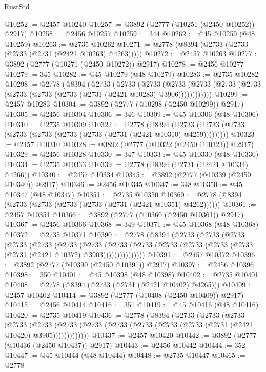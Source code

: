 \begin{lexlean}{RustStd}
\begin{coremodule}
@10252 := @2457 @10240
@10257 := @3892 (@2777 (@10251 (@2450 @10252)) @2917)
@10258 := @2456 @10257
@10259 := 344
@10262 := @45 @10259 (@48 @10259)
@10263 := @2735 @10262
@10271 := @2778 (@8394 (@2733 (@2733 (@2733 (@2731 (@2421 @10263) @4263)))))
@10272 := @2457 @10263
@10277 := @3892 (@2777 (@10271 (@2450 @10272)) @2917)
@10278 := @2456 @10277
@10279 := 345
@10282 := @45 @10279 (@48 @10279)
@10283 := @2735 @10282
@10298 := @2778
    (@8394
      (@2733
        (@2733
          (@2733
            (@2733 (@2733 (@2733 (@2733 (@2733 (@2733 (@2733 (@2731 (@2421 @10283) @3906))))))))))))
@10299 := @2457 @10283
@10304 := @3892 (@2777 (@10298 (@2450 @10299)) @2917)
@10305 := @2456 @10304
@10306 := 346
@10309 := @45 @10306 (@48 @10306)
@10310 := @2735 @10309
@10322 := @2778
    (@8394 (@2733 (@2733 (@2733 (@2733 (@2733 (@2733 (@2733 (@2731 (@2421 @10310) @4259)))))))))
@10323 := @2457 @10310
@10328 := @3892 (@2777 (@10322 (@2450 @10323)) @2917)
@10329 := @2456 @10328
@10330 := 347
@10333 := @45 @10330 (@48 @10330)
@10334 := @2735 @10333
@10339 := @2778 (@8394 (@2731 (@2421 @10334) @4266))
@10340 := @2457 @10334
@10345 := @3892 (@2777 (@10339 (@2450 @10340)) @2917)
@10346 := @2456 @10345
@10347 := 348
@10350 := @45 @10347 (@48 @10347)
@10351 := @2735 @10350
@10360 := @2778 (@8394 (@2733 (@2733 (@2733 (@2733 (@2731 (@2421 @10351) @4262))))))
@10361 := @2457 @10351
@10366 := @3892 (@2777 (@10360 (@2450 @10361)) @2917)
@10367 := @2456 @10366
@10368 := 349
@10371 := @45 @10368 (@48 @10368)
@10372 := @2735 @10371
@10390 := @2778
    (@8394
      (@2733
        (@2733
          (@2733
            (@2733
              (@2733
                (@2733
                  (@2733
                    (@2733
                      (@2733 (@2733 (@2733 (@2733 (@2733 (@2731 (@2421 @10372) @3903)))))))))))))))
@10391 := @2457 @10372
@10396 := @3892 (@2777 (@10390 (@2450 @10391)) @2917)
@10397 := @2456 @10396
@10398 := 350
@10401 := @45 @10398 (@48 @10398)
@10402 := @2735 @10401
@10408 := @2778 (@8394 (@2733 (@2731 (@2421 @10402) @4265)))
@10409 := @2457 @10402
@10414 := @3892 (@2777 (@10408 (@2450 @10409)) @2917)
@10415 := @2456 @10414
@10416 := 351
@10419 := @45 @10416 (@48 @10416)
@10420 := @2735 @10419
@10436 := @2778
    (@8394
      (@2733
        (@2733
          (@2733
            (@2733
              (@2733
                (@2733 (@2733 (@2733 (@2733 (@2733 (@2733 (@2731 (@2421 @10420) @3905)))))))))))))
@10437 := @2457 @10420
@10442 := @3892 (@2777 (@10436 (@2450 @10437)) @2917)
@10443 := @2456 @10442
@10444 := 352
@10447 := @45 @10444 (@48 @10444)
@10448 := @2735 @10447
@10465 := @2778

\end{coremodule}
\end{lexlean}
